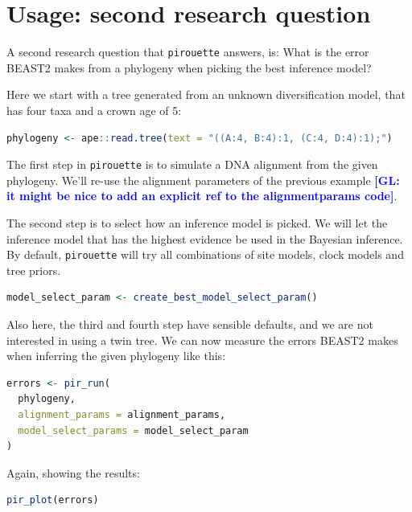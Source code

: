 \documentclass{article}
\newcommand{\giovanni}[1]{\textcolor{blue}{\textbf{[GL: #1]}}}
\begin{document}
\section{Usage: second research question}

A second research question that \verb;pirouette; answers, is:
What is the error BEAST2 makes from a phylogeny when
picking the best inference model?

Here we start with a tree generated from an unknown 
diversification model, that has four taxa and a crown age of 5:

\begin{lstlisting}[language=R, floatplacement=H]
phylogeny <- ape::read.tree(text = "((A:4, B:4):1, (C:4, D:4):1);")
\end{lstlisting}

The first step in \verb;pirouette; is to simulate a DNA alignment from the 
given phylogeny. We'll re-use the alignment parameters of the previous example \giovanni{it might be nice to add an explicit ref to the alignmentparams code}.

The second step is to select how an inference model is picked.
We will let the inference model that has the highest evidence be used
in the Bayesian inference. By default, \verb;pirouette; will try
all combinations of site models, clock models and tree priors.

\begin{lstlisting}[language=R, floatplacement=H]
model_select_param <- create_best_model_select_param()
\end{lstlisting}

Also here, the third and fourth step have sensible defaults, and we are not
interested in using a twin tree. We can now measure the errors BEAST2
makes when inferring the given phylogeny like this:

\begin{lstlisting}[language=R, floatplacement=H]
errors <- pir_run(
  phylogeny,
  alignment_params = alignment_params,
  model_select_params = model_select_param
)
\end{lstlisting}

Again, showing the results:

\begin{lstlisting}[language=R, floatplacement=H]
pir_plot(errors)
\end{lstlisting}
\end{document}
